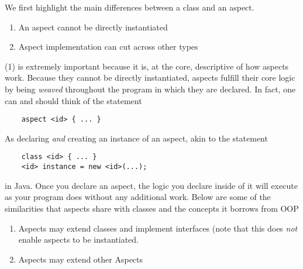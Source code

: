 \documentclass[sigconf]{acmart}
\begin{document}
We first highlight the main differences between a class and an aspect.
\begin{enumerate}
    \item An aspect cannot be directly instantiated \cite{LangDeats}
    \item Aspect implementation can cut across other types \cite{LangDeats}
\end{enumerate}
(1) is extremely important because it is, at the core, descriptive of how aspects work. Because they cannot be directly instantiated, aspects fulfill their core logic by being \textit{weaved} throughout the program in which they are declared. In fact, one can and should think of the statement
\begin{verbatim}
    aspect <id> { ... }
\end{verbatim}
As declaring \textit{and} creating an instance of an aspect, akin to the statement
\begin{verbatim}
    class <id> { ... }
    <id> instance = new <id>(...);
\end{verbatim}
in Java. Once you declare an aspect, the logic you declare inside of it will execute as your program does without any additional work. Below are some of the similarities that aspects share with classes and the concepts it borrows from OOP
\begin{enumerate}
    \item Aspects may extend classes and implement interfaces (note that this does \textit{not} enable aspects to be instantiated. \cite{LangDeats}
    \item Aspects may extend other Aspects
\end{enumerate}
\end{document}
